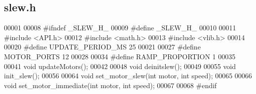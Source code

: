 \subsection{slew.\+h}
\label{slew_8h_source}

\begin{DoxyCode}
00001 
00008 \textcolor{preprocessor}{#ifndef \_SLEW\_H\_}
00009 \textcolor{preprocessor}{#define \_SLEW\_H\_}
00010 
00011 \textcolor{preprocessor}{#include <API.h>}
00012 \textcolor{preprocessor}{#include <math.h>}
00013 \textcolor{preprocessor}{#include <vlib.h>}
00014 
00020 \textcolor{preprocessor}{#define UPDATE\_PERIOD\_MS 25}
00021 
00027 \textcolor{preprocessor}{#define MOTOR\_PORTS 12}
00028 
00034 \textcolor{preprocessor}{#define RAMP\_PROPORTION 1}
00035 
00041 \textcolor{keywordtype}{void} updateMotors();
00042 
00048 \textcolor{keywordtype}{void} deinitslew();
00049 
00055 \textcolor{keywordtype}{void} init_slew();
00056 
00064 \textcolor{keywordtype}{void} set_motor_slew(\textcolor{keywordtype}{int} motor, \textcolor{keywordtype}{int} speed);
00065 
00066 \textcolor{keywordtype}{void} set_motor_immediate(\textcolor{keywordtype}{int} motor, \textcolor{keywordtype}{int} speed);
00067 
00068 \textcolor{preprocessor}{#endif}
\end{DoxyCode}
